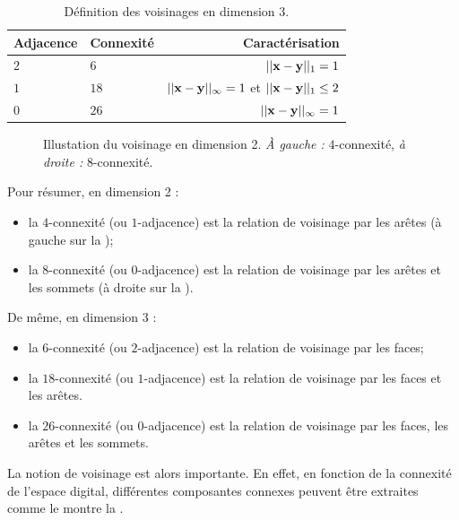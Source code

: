 \begin{table}[ht]
  \centering
  \caption{Définition des voisinages en dimension $3$.}
  \label{tab:adjacence3d}
    \renewcommand{\arraystretch}{1.1}
  \begin{tabular}{@{}llr@{}}
    \toprule
    Adjacence & Connexité  & Caractérisation \\ \midrule
    $2$ & $6$        & $||\mathbf{x} - \mathbf{y}||_1 = 1$ \\
    $1$ & $18$       & $||\mathbf{x} - \mathbf{y}||_\infty = 1$ et $||\mathbf{x} - \mathbf{y}||_1 \le 2$ \\
    $0$ & $26$       & $||\mathbf{x} - \mathbf{y}||_\infty = 1$ \\
    \bottomrule
  \end{tabular}
\end{table}

\begin{figure}[ht]
  \begin{center}
    
    \caption{Illustation du voisinage en dimension 2. \emph{À gauche :}
    $4$-connexité, \emph{à droite :} $8$-connexité.\label{fig:adjacence2d}}
  \end{center}
\end{figure}


Pour résumer, en dimension 2 :
%
\begin{itemize}
  \item la $4$-connexité (ou $1$-adjacence) est la relation de voisinage par les
  arêtes (à gauche sur la );
  \item la $8$-connexité (ou $0$-adjacence) est la relation de voisinage par les
  arêtes et les sommets (à droite sur la ).
\end{itemize}
%
De même, en dimension 3 :
%
\begin{itemize}
  \item la $6$-connexité (ou $2$-adjacence) est la relation de voisinage par les
  faces;
  \item la $18$-connexité (ou $1$-adjacence) est la relation de voisinage par
  les faces et les arêtes.
  \item la $26$-connexité (ou $0$-adjacence) est la relation de voisinage par
  les faces, les arêtes et les sommets.
\end{itemize}


La notion de voisinage est alors importante. En effet, en fonction de la
connexité de l'espace digital, différentes composantes connexes peuvent être
extraites comme le montre la .

